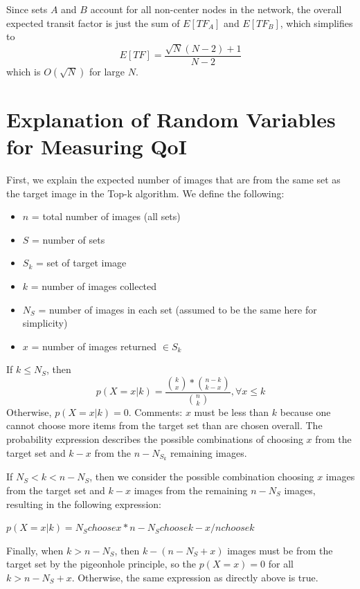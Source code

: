 Since sets $A$ and $B$ account for all non-center nodes in the network, the overall expected transit factor is just the sum of $E[TF_A]$ and $E[TF_B]$, which simplifies to
\begin{equation}
	E[TF] = \frac{\sqrt{N}(N - 2) + 1}{N-2}
\end{equation}
which is  $O(\sqrt{N})$ for large $N$.



\section{Explanation of Random Variables for Measuring QoI}
First, we explain the expected number of images that are from the same set as the target image in the Top-k algorithm.  We define the following:  

\begin{itemize}
	\item $n$ = total number of images (all sets)
	\item $S$ = number of sets
	\item $S_k$ = set of target image
	\item $k$ = number of images collected
	\item $N_{S}$ = number of images in each set (assumed to be the same here for simplicity)
	\item $x$ = number of images returned $\in S_k$
\end{itemize}

If $k \leq N_{S}$, then 
\begin{equation}
	p(X = x | k) = \frac{{k \choose x} * {n-k \choose k-x} }{ {n \choose k}}, \forall x \leq k
\end{equation}
Otherwise, $p(X = x | k) = 0$.
Comments:  $x$ must be less than $k$ because one cannot choose more items from the target set than are chosen overall.  The probability expression describes the possible combinations of choosing $x$ from the target set and $k-x$ from the $n - N_{S_k}$ remaining images.

If $N_{S} < k < n-N_{S}$, then we consider the possible combination choosing $x$ images from the target set and $k-x$ images from the remaining $n-N_{S}$ images, resulting in the following expression:

$p(X = x | k) = N_{S} choose x * n-N_{S} choose k-x / n choose k$

Finally, when $k > n-N_{S}$, then $k - (n-N_{S} + x)$ images must be from the target set by the pigeonhole principle, so the $p(X = x) = 0$ for all $k > n - N_{S} + x$.  Otherwise, the same expression as directly above is true.


